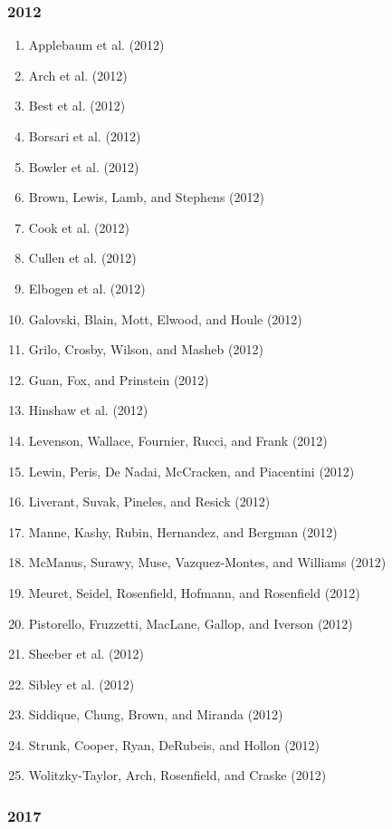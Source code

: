 \documentclass[english,man]{apa6}
\providecommand{\tightlist}{%
  \setlength{\itemsep}{0pt}\setlength{\parskip}{0pt}}
\theoremstyle{definition}
\theoremstyle{definition}
\theoremstyle{definition}
\theoremstyle{remark}
\begin{document}
\subsubsection{2012}\label{section-2}

\begin{enumerate}
\def\labelenumi{\arabic{enumi})}
\tightlist
\item
  Applebaum et al. (2012)
\item
  Arch et al. (2012)
\item
  Best et al. (2012)
\item
  Borsari et al. (2012)
\item
  Bowler et al. (2012)
\item
  Brown, Lewis, Lamb, and Stephens (2012)
\item
  Cook et al. (2012)
\item
  Cullen et al. (2012)
\item
  Elbogen et al. (2012)
\item
  Galovski, Blain, Mott, Elwood, and Houle (2012)
\item
  Grilo, Crosby, Wilson, and Masheb (2012)
\item
  Guan, Fox, and Prinstein (2012)
\item
  Hinshaw et al. (2012)
\item
  Levenson, Wallace, Fournier, Rucci, and Frank (2012)
\item
  Lewin, Peris, De Nadai, McCracken, and Piacentini (2012)
\item
  Liverant, Suvak, Pineles, and Resick (2012)
\item
  Manne, Kashy, Rubin, Hernandez, and Bergman (2012)
\item
  McManus, Surawy, Muse, Vazquez-Montes, and Williams (2012)
\item
  Meuret, Seidel, Rosenfield, Hofmann, and Rosenfield (2012)
\item
  Pistorello, Fruzzetti, MacLane, Gallop, and Iverson (2012)
\item
  Sheeber et al. (2012)
\item
  Sibley et al. (2012)
\item
  Siddique, Chung, Brown, and Miranda (2012)
\item
  Strunk, Cooper, Ryan, DeRubeis, and Hollon (2012)
\item
  Wolitzky-Taylor, Arch, Rosenfield, and Craske (2012)
\end{enumerate}

\subsubsection{2017}\label{section-3}
\end{document}
